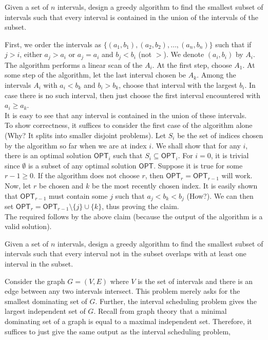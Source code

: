 \begin{exercise}
	Given a set of $n$ intervals, design a greedy algorithm to find the smallest subset of intervals such that every interval is contained in the union of the intervals of the subset.
\end{exercise}
\begin{solution*}
	First, we order the intervals as $\{(a_1,b_1),(a_2,b_2),\ldots,(a_n,b_n)\}$ such that if $j>i$, either $a_j>a_i$ or $a_j=a_i$ and $b_j<b_i$ (not $>$). We denote $(a_i,b_i)$ by $A_i$.\\
	The algorithm performs a linear scan of the $A_i$. At the first step, choose $A_1$. At some step of the algorithm, let the last interval chosen be $A_k$. Among the intervals $A_i$ with $a_i<b_k$ and $b_i>b_k$, choose that interval with the largest $b_i$. In case there is no such interval, then just choose the first interval encountered with $a_i\geq a_k$.\\
	It is easy to see that any interval is contained in the union of these intervals.\\

	To show correctness, it suffices to consider the first case of the algorithm alone (Why? It splits into smaller disjoint problems). Let $S_i$ be the set of indices chosen by the algorithm so far when we are at index $i$. We shall show that for any $i$, there is an optimal solution $\mathsf{OPT}_i$ such that $S_i\subseteq\mathsf{OPT}_i$. For $i=0$, it is trivial since $\emptyset$ is a subset of any optimal solution $\mathsf{OPT}$. Suppose it is true for some $r-1\geq 0$. If the algorithm does not choose $r$, then $\mathsf{OPT}_r=\mathsf{OPT}_{r-1}$ will work. Now, let $r$ be chosen and $k$ be the most recently chosen index. It is easily shown that $\mathsf{OPT}_{r-1}$ must contain some $j$ such that $a_j<b_k<b_j$ (How?). We can then set $\mathsf{OPT}_r=\mathsf{OPT}_{r-1}\setminus \{j\}\cup\{k\}$, thus proving the claim.\\
	The required follows by the above claim (because the output of the algorithm is a valid solution).
\end{solution*}

\begin{exercise}
	Given a set of $n$ intervals, design a greedy algorithm to find the smallest subset of intervals such that every interval not in the subset overlaps with at least one interval in the subset.
\end{exercise}
\begin{solution*}
	Consider the graph $G=(V,E)$ where $V$ is the set of intervals and there is an edge between any two intervals intersect. This problem merely asks for the smallest dominating set of $G$.\footnotemark{} Further, the interval scheduling problem gives the largest independent set of $G$. Recall from graph theory that a minimal dominating set of a graph is equal to a maximal independent set. Therefore, it suffices to just give the same output as the interval scheduling problem,
\end{solution*}
